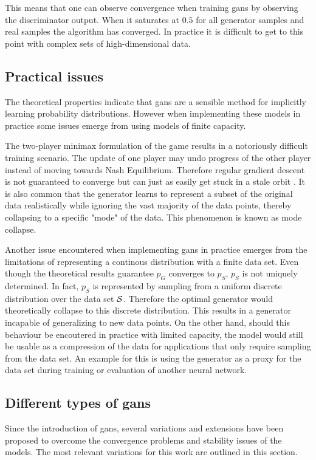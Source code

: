 This means that one can observe convergence when training \acrshort{gans} by observing the discriminator output. When it saturates at $0.5$ for all generator samples and real samples the algorithm has converged. In practice it is difficult to get to this point with complex sets of high-dimensional data.

\subsection{Practical issues}
The theoretical properties indicate that \acrshort{gans} are a sensible method for implicitly learning probability distributions. However when implementing these models in practice some issues emerge from using models of finite capacity. 

The two-player minimax formulation of the game results in a notoriously difficult training scenario. The update of one player may undo progress of the other player instead of moving towards Nash Equilibrium. Therefore regular gradient descent is not guaranteed to converge but can just as easily get stuck in a stale orbit \textcite{salimans2016improved}. It is also common that the generator learns to represent a subset of the original data realistically while ignoring the vast majority of the data points, thereby collapsing to a specific "mode" of the data. This phenomenon is known as mode collapse.

Another issue encountered when implementing \acrshort{gans} in practice emerges from the limitations of representing a continous distribution with a finite data set. Even though the theoretical results guarantee $p_G$ converges to $p_S$, $p_S$ is not uniquely determined. In fact, $p_S$ is represented by sampling from a uniform discrete distribution over the data set $\mathcal{S}$. Therefore the optimal generator would theoretically collapse to this discrete distribution. This results in a generator incapable of generalizing to new data points. On the other hand, should this behaviour be encoutered in practice with limited capacity, the model would still be usable as a compression of the data for applications that only require sampling from the data set. An example for this is using the generator as a proxy for the data set during training or evaluation of another neural network.
 
\subsection{Different types of \acrshort{gans}}
Since the introduction of \acrshort{gans}, several variations and extensions have been proposed to overcome the convergence problems and stability issues of the models. The most relevant variations for this work are outlined in this section.

